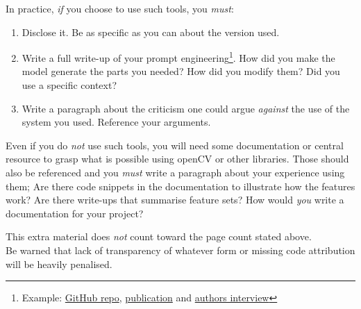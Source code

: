 \documentclass{labo}
\begin{document}
In practice, \textit{if} you choose to use such tools, you \textit{must}:
\begin{enumerate}
	\item Disclose it. Be as specific as you can about the version used.
	\item Write a full write-up of your prompt engineering\footnote{Example: \href{https://github.com/JBlocklove/tt03-qtchallenges-chatgpt_4}{GitHub repo}, \href{https://arxiv.org/abs/2305.13243}{publication} and \href{https://www.youtube.com/watch?v=6vC3t_soJok}{authors interview}}. How did you make the model generate the parts you needed? How did you modify them? Did you use a specific context?
	\item Write a paragraph about the criticism one could argue \textit{against} the use of the system you used. Reference your arguments.
\end{enumerate}

Even if you do \textit{not} use such tools, you will need some documentation or central resource to grasp what is possible using openCV or other libraries. Those should also be referenced and you \textit{must} write a paragraph about your experience using them; Are there code snippets in the documentation to illustrate how the features work? Are there write-ups that summarise feature sets? How would \textit{you} write a documentation for your project?

This extra material does \textit{not} count toward the page count stated above.\\

Be warned that lack of transparency of whatever form or missing code attribution will be heavily penalised.
\end{document}
